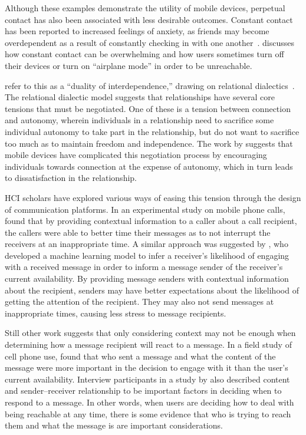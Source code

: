 \documentclass[12pt]{nuthesis}	%
\begin{document}
Although these examples demonstrate the utility of mobile devices, perpetual contact has also been associated with less desirable outcomes. Constant contact has been reported to increased feelings of anxiety, as friends may become overdependent as a result of constantly checking in with one another~\citep{baym2015personal}. \citet{ames2013managing} discusses how constant contact can be overwhelming and how users sometimes turn off their devices or turn on ``airplane mode'' in order to be unreachable.

\citet{hall2012calling} refer to this as a ``duality of interdependence,'' drawing on relational dialectics~\citep{baxter1993relationship}. The relational dialectic model suggests that relationships have several core tensions that must be negotiated. One of these is a tension between connection and autonomy, wherein individuals in a relationship need to sacrifice some individual autonomy to take part in the relationship, but do not want to sacrifice too much as to maintain freedom and independence. The work by \citeauthor{hall2012calling} suggests that mobile devices have complicated this negotiation process by encouraging individuals towards connection at the expense of autonomy, which in turn leads to dissatisfaction in the relationship.

HCI scholars have explored various ways of easing this tension through the design of communication platforms. In an experimental study on mobile phone calls, \citet{avrahami2007improving} found that by providing contextual information to a caller about a call recipient, the callers were able to better time their messages as to not interrupt the receivers at an inappropriate time. A similar approach was suggested by \citet{pielot2014didn}, who developed a machine learning model to infer a receiver's likelihood of engaging with a received message in order to inform a message sender of the receiver's current availability. By providing message senders with contextual information about the recipient, senders may have better expectations about the likelihood of getting the attention of the recipient. They may also not send messages at inappropriate times, causing less stress to message recipients.

Still other work suggests that only considering context may not be enough when determining how a message recipient will react to a message. In a field study of cell phone use, \citet{grandhi2010technology} found that who sent a message and what the content of the message were more important in the decision to engage with it than the user's current availability. Interview participants in a study by \citet{wohn2015ambient} also described content and sender--receiver relationship to be important factors in deciding when to respond to a message. In other words, when users are deciding how to deal with being reachable at any time, there is some evidence that who is trying to reach them and what the message is are important considerations.
\end{document}
